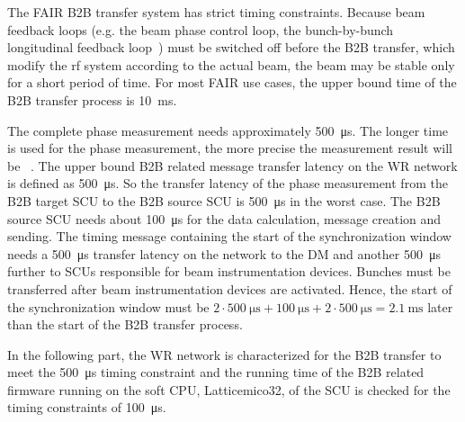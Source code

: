 The FAIR B2B transfer system has strict timing constraints. Because beam feedback loops (e.g. the beam phase control
loop, the bunch-by-bunch longitudinal feedback loop~\cite{klingbeil_new_2011}) must be switched off before the B2B transfer, which modify the rf system according to the actual beam, the beam may be stable only for a short period of time. For most FAIR use cases, the upper bound time of the B2B transfer process is \SI{10}{\ms}. 

The complete phase measurement needs approximately \SI{500}{\us}. The longer time is used for the phase measurement, the
more precise the measurement result will be ~\cite{ferrand_development_nodate}. The upper bound B2B related message transfer latency  on the WR network is defined as \SI{500}{\us}. So the transfer latency of the phase measurement from the B2B target SCU to the B2B source SCU is \SI{500}{\us} in the worst case. The B2B source SCU needs about \SI{100}{\us} for the data calculation, message creation and sending. The timing message containing the start of the synchronization window needs a \SI{500}{\us} transfer latency on the network to the DM and another \SI{500}{\us} further to SCUs responsible for beam instrumentation devices. Bunches must be transferred  after beam instrumentation devices are activated. Hence, the start of the synchronization window must be $2 \cdot \SI{500}{\us} + \SI{100}{\us} + 2\cdot\SI{500}{\us} = \SI{2.1}{\ms}$ later than the start of the B2B transfer process. 

In the following part, the WR network is characterized for the B2B transfer to meet the \SI{500}{\us} timing constraint and the running time of the B2B related firmware running on the soft CPU, Latticemico32, of the SCU is checked for the timing constraints of \SI{100}{\us}.

